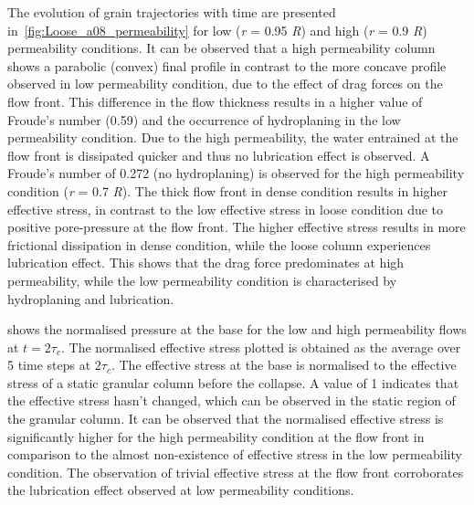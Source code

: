 The evolution of grain trajectories with time are presented 
in~\cref{fig:Loose_a08_permeability} for low (\textit{r} = 0.95 \textit{R}) and 
high (\textit{r} = 0.9 \textit{R})
permeability conditions. It can be observed that a high 
permeability column shows a parabolic (convex) final profile in contrast to the 
more concave profile observed in low permeability condition, due to the effect 
of drag forces on the flow front. This difference in the flow thickness results 
in a higher value of Froude's number (0.59) and the occurrence of hydroplaning 
in the low permeability condition. Due to the high permeability, the water 
entrained at the flow front is dissipated quicker and 
thus no lubrication effect is observed. A Froude's number of 0.272 (no 
hydroplaning) is observed for the high permeability condition (\textit{r} = 0.7 
\textit{R}). The 
thick flow front in dense condition results in higher effective stress, in 
contrast to the low effective stress in loose condition due to positive 
pore-pressure at the flow front. The higher effective stress results in more 
frictional dissipation in dense condition, while the loose column experiences
lubrication effect. This shows that the drag force predominates at high 
permeability, while the low permeability condition is characterised by 
hydroplaning and lubrication.

 shows the normalised pressure at the 
base for the low and high permeability flows at $ t = 2\tau_c$. The normalised 
effective stress plotted is obtained as the average over 5 time steps at 
$2\tau_c$. The effective stress at the base is normalised to the effective 
stress of a static granular column before the collapse. A value of 1 indicates 
that the effective stress hasn't changed, which can be observed in the static 
region of the granular column. It can be observed that the normalised effective 
stress is significantly higher for the high permeability condition at the flow 
front in comparison to the almost non-existence of effective stress in the low 
permeability condition. The observation of trivial effective stress at the flow 
front corroborates the lubrication effect observed at low permeability 
conditions.

